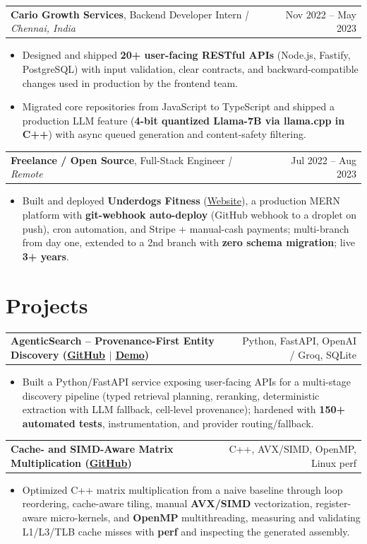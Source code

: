 \documentclass[letterpaper,11pt]{article}
\makeatletter
\newcommand{\expItem}[4]{%
  \vspace{3pt}
  \begin{tabular*}{\textwidth}{@{}l@{\extracolsep{\fill}}r@{}}
    \textbf{#1}, #2 \textit{| #3} & #4 \\
  \end{tabular*}\par\vspace{-2pt}
}
\newcommand{\projItem}[2]{%
  \vspace{6pt}
  \begin{tabular*}{\textwidth}{@{}l@{\extracolsep{\fill}}r@{}}
    \textbf{#1} & #2 \\
  \end{tabular*}\par\vspace{-2pt}
}
\makeatother
\begin{document}
\expItem{Cario Growth Services}{Backend Developer Intern}{Chennai, India}{Nov 2022 -- May 2023}
\begin{itemize}
  \item Designed and shipped \textbf{20+ user-facing RESTful APIs} (Node.js, Fastify, PostgreSQL) with input validation, clear contracts, and backward-compatible changes used in production by the frontend team.
  \item Migrated core repositories from JavaScript to TypeScript and shipped a production LLM feature (\textbf{4-bit quantized Llama-7B via llama.cpp in C++}) with async queued generation and content-safety filtering.
\end{itemize}

\expItem{Freelance / Open Source}{Full-Stack Engineer}{Remote}{Jul 2022 -- Aug 2023}
\begin{itemize}
  \item Built and deployed \textbf{Underdogs Fitness} (\href{https://www.underdogsfitness.in/}{Website}), a production MERN platform with \textbf{git-webhook auto-deploy} (GitHub webhook to a droplet on push), cron automation, and Stripe + manual-cash payments; multi-branch from day one, extended to a 2nd branch with \textbf{zero schema migration}; live \textbf{3+ years}.
\end{itemize}

\section{Projects}

\projItem{AgenticSearch -- Provenance-First Entity Discovery {\normalfont\small(\href{https://github.com/Deva-1903/ciir_agentic_search}{GitHub} $\vert$ \href{https://agentic-search-negglszkwa-uc.a.run.app}{Demo})}}{Python, FastAPI, OpenAI / Groq, SQLite}
\begin{itemize}
  \item Built a Python/FastAPI service exposing user-facing APIs for a multi-stage discovery pipeline (typed retrieval planning, reranking, deterministic extraction with LLM fallback, cell-level provenance); hardened with \textbf{150+ automated tests}, instrumentation, and provider routing/fallback.
\end{itemize}

\projItem{Cache- and SIMD-Aware Matrix Multiplication {\normalfont\small(\href{https://github.com/Deva-1903/cs690pf}{GitHub})}}{C++, AVX/SIMD, OpenMP, Linux perf}
\begin{itemize}
  \item Optimized C++ matrix multiplication from a naive baseline through loop reordering, cache-aware tiling, manual \textbf{AVX/SIMD} vectorization, register-aware micro-kernels, and \textbf{OpenMP} multithreading, measuring and validating L1/L3/TLB cache misses with \textbf{perf} and inspecting the generated assembly.
\end{itemize}
\end{document}
